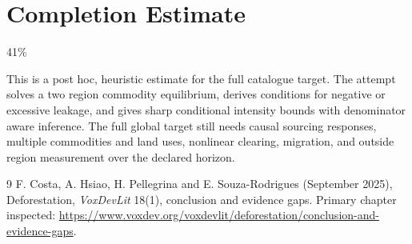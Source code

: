 \documentclass[11pt]{article}
\begin{document}
\section{Completion Estimate}
41\%

This is a post hoc, heuristic estimate for the full catalogue target.
The attempt solves a two region commodity equilibrium, derives conditions for negative or excessive leakage, and gives sharp conditional intensity bounds with denominator aware inference. The full global target still needs causal sourcing responses, multiple commodities and land uses, nonlinear clearing, migration, and outside region measurement over the declared horizon.

\begin{thebibliography}{9}
 F. Costa, A. Hsiao, H. Pellegrina and E. Souza-Rodrigues (September 2025), Deforestation, \emph{VoxDevLit} 18(1), conclusion and evidence gaps. Primary chapter inspected:
\url{https://www.voxdev.org/voxdevlit/deforestation/conclusion-and-evidence-gaps}.
\end{thebibliography}
\end{document}
